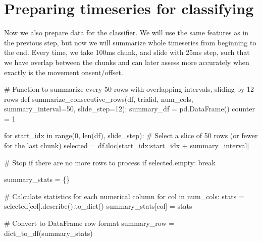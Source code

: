 \documentclass[
  letterpaper,
  DIV=11,
  numbers=noendperiod]{scrreprt}
\newenvironment{Shaded}{\begin{snugshade}}{\end{snugshade}}
\newcommand{\BuiltInTok}[1]{\textcolor[rgb]{0.00,0.23,0.31}{#1}}
\newcommand{\CommentTok}[1]{\textcolor[rgb]{0.37,0.37,0.37}{#1}}
\newcommand{\ControlFlowTok}[1]{\textcolor[rgb]{0.00,0.23,0.31}{#1}}
\newcommand{\DecValTok}[1]{\textcolor[rgb]{0.68,0.00,0.00}{#1}}
\newcommand{\KeywordTok}[1]{\textcolor[rgb]{0.00,0.23,0.31}{#1}}
\newcommand{\NormalTok}[1]{\textcolor[rgb]{0.00,0.23,0.31}{#1}}
\newcommand{\OperatorTok}[1]{\textcolor[rgb]{0.37,0.37,0.37}{#1}}
\begin{document}

\chapter{Preparing timeseries for
classifying}\label{preparing-timeseries-for-classifying}

Now we also prepare data for the classifier. We will use the same
features as in the previous step, but now we will summarize whole
timeseries from beginning to the end. Every time, we take 100ms chunk,
and slide with 25ms step, such that we have overlap between the chunks
and can later assess more accurately when exactly is the movement
onsent/offset.

\begin{Shaded}
\begin{Highlighting}[]
\CommentTok{\# Function to summarize every 50 rows with overlapping intervals, sliding by 12 rows}
\KeywordTok{def}\NormalTok{ summarize\_consecutive\_rows(df, trialid, num\_cols, summary\_interval}\OperatorTok{=}\DecValTok{50}\NormalTok{, slide\_step}\OperatorTok{=}\DecValTok{12}\NormalTok{):}
\NormalTok{    summary\_df }\OperatorTok{=}\NormalTok{ pd.DataFrame()}
\NormalTok{    counter }\OperatorTok{=} \DecValTok{1}

    \ControlFlowTok{for}\NormalTok{ start\_idx }\KeywordTok{in} \BuiltInTok{range}\NormalTok{(}\DecValTok{0}\NormalTok{, }\BuiltInTok{len}\NormalTok{(df), slide\_step):}
        \CommentTok{\# Select a slice of 50 rows (or fewer for the last chunk)}
\NormalTok{        selected }\OperatorTok{=}\NormalTok{ df.iloc[start\_idx:start\_idx }\OperatorTok{+}\NormalTok{ summary\_interval]}
        
        \CommentTok{\# Stop if there are no more rows to process}
        \ControlFlowTok{if}\NormalTok{ selected.empty:}
            \ControlFlowTok{break}
            
\NormalTok{        summary\_stats }\OperatorTok{=}\NormalTok{ \{\}}

        \CommentTok{\# Calculate statistics for each numerical column}
        \ControlFlowTok{for}\NormalTok{ col }\KeywordTok{in}\NormalTok{ num\_cols:}
\NormalTok{            stats }\OperatorTok{=}\NormalTok{ selected[col].describe().to\_dict()}
\NormalTok{            summary\_stats[col] }\OperatorTok{=}\NormalTok{ stats}

        \CommentTok{\# Convert to DataFrame row format}
\NormalTok{        summary\_row }\OperatorTok{=}\NormalTok{ dict\_to\_df(summary\_stats)}


\end{Highlighting}
\end{Shaded}
\end{document}
